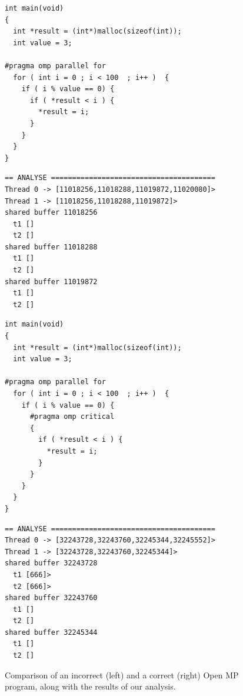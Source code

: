\begin{figure}
  \centering
  \lstset{language=C, basicstyle=\small}

  \begin{minipage}{.45\textwidth}
    \begin{lstlisting}
int main(void) 
{
  int *result = (int*)malloc(sizeof(int));
  int value = 3;
  
#pragma omp parallel for 
  for ( int i = 0 ; i < 100  ; i++ )  {
    if ( i % value == 0) {
      if ( *result < i ) {
        *result = i;
      }
    }
  }
}
    \end{lstlisting}
    \vspace{8mm}
    \lstset{basicstyle=\scriptsize}
    \begin{lstlisting}
== ANALYSE =======================================
Thread 0 -> [11018256,11018288,11019872,11020080]>
Thread 1 -> [11018256,11018288,11019872]>
shared buffer 11018256
  t1 []
  t2 []
shared buffer 11018288
  t1 []
  t2 []
shared buffer 11019872
  t1 []
  t2 []
    \end{lstlisting}
  \end{minipage}
  \hspace{.025\textwidth}
  \hspace{.025\textwidth}
  \begin{minipage}{.45\textwidth}
    \begin{lstlisting}
int main(void) 
{
  int *result = (int*)malloc(sizeof(int));
  int value = 3;
  
#pragma omp parallel for 
  for ( int i = 0 ; i < 100  ; i++ )  {
    if ( i % value == 0) {
      #pragma omp critical 
      {
        if ( *result < i ) {
          *result = i;
        }
      }
    }
  }
}
    \end{lstlisting}
    \lstset{basicstyle=\scriptsize}
    \begin{lstlisting}
== ANALYSE =======================================
Thread 0 -> [32243728,32243760,32245344,32245552]>
Thread 1 -> [32243728,32243760,32245344]>
shared buffer 32243728
  t1 [666]>
  t2 [666]>
shared buffer 32243760
  t1 []
  t2 []
shared buffer 32245344
  t1 []
  t2 []
    \end{lstlisting}
  \end{minipage}
  \caption{Comparison of an incorrect (left) and a correct (right)
    Open MP program, along with the results of our analysis.}
  \label{fig:openmp}
\end{figure}